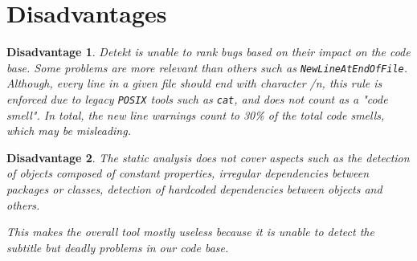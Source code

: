 \documentclass[11pt,twocolumn]{article}
\newtheorem{remark}{Disadvantage}
\begin{document}
\section{Disadvantages}

\begin{remark}
Detekt is unable to rank bugs based on their impact on the code base. Some problems are more relevant than others such as \texttt{NewLineAtEndOfFile}. Although, every line in a given file should end with character \textit{/\/n}, this rule is enforced due to legacy \texttt{POSIX} tools such as \texttt{cat}, and does not count as a "code smell". In total, the new line warnings count to 30\% of the total code smells, which may be misleading.
\end{remark}

\begin{remark}
The static analysis does not cover aspects such as the detection of objects composed of constant properties, irregular dependencies between packages or classes, detection of hardcoded dependencies between objects and others. 

This makes the overall tool mostly useless because it is unable to detect the subtitle but deadly problems in our code base.
\end{remark}
\end{document}
